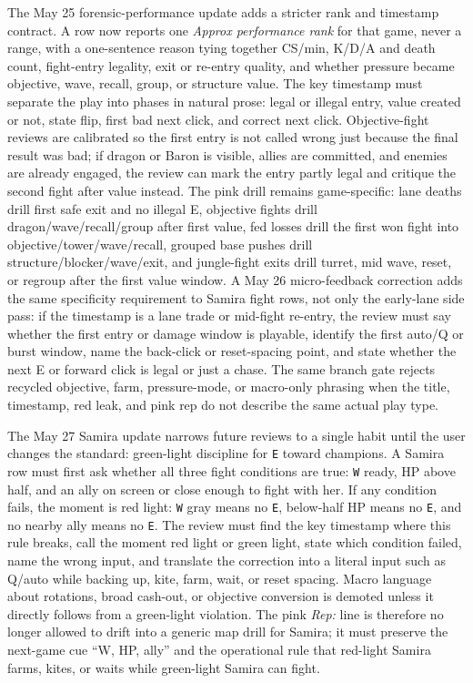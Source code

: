 \documentclass[12pt,letterpaper]{article}
\begin{document}
\noindent The May 25 forensic-performance update adds a stricter rank and timestamp contract. A row now reports one \emph{Approx performance rank} for that game, never a range, with a one-sentence reason tying together CS/min, K/D/A and death count, fight-entry legality, exit or re-entry quality, and whether pressure became objective, wave, recall, group, or structure value. The key timestamp must separate the play into phases in natural prose: legal or illegal entry, value created or not, state flip, first bad next click, and correct next click. Objective-fight reviews are calibrated so the first entry is not called wrong just because the final result was bad; if dragon or Baron is visible, allies are committed, and enemies are already engaged, the review can mark the entry partly legal and critique the second fight after value instead. The pink drill remains game-specific: lane deaths drill first safe exit and no illegal E, objective fights drill dragon/wave/recall/group after first value, fed losses drill the first won fight into objective/tower/wave/recall, grouped base pushes drill structure/blocker/wave/exit, and jungle-fight exits drill turret, mid wave, reset, or regroup after the first value window. A May 26 micro-feedback correction adds the same specificity requirement to Samira fight rows, not only the early-lane side pass: if the timestamp is a lane trade or mid-fight re-entry, the review must say whether the first entry or damage window is playable, identify the first auto/Q or burst window, name the back-click or reset-spacing point, and state whether the next E or forward click is legal or just a chase. The same branch gate rejects recycled objective, farm, pressure-mode, or macro-only phrasing when the title, timestamp, red leak, and pink rep do not describe the same actual play type.

\noindent The May 27 Samira update narrows future reviews to a single habit until the user changes the standard: green-light discipline for \texttt{E} toward champions. A Samira row must first ask whether all three fight conditions are true: \texttt{W} ready, HP above half, and an ally on screen or close enough to fight with her. If any condition fails, the moment is red light: \texttt{W} gray means no \texttt{E}, below-half HP means no \texttt{E}, and no nearby ally means no \texttt{E}. The review must find the key timestamp where this rule breaks, call the moment red light or green light, state which condition failed, name the wrong input, and translate the correction into a literal input such as Q/auto while backing up, kite, farm, wait, or reset spacing. Macro language about rotations, broad cash-out, or objective conversion is demoted unless it directly follows from a green-light violation. The pink \emph{Rep:} line is therefore no longer allowed to drift into a generic map drill for Samira; it must preserve the next-game cue ``W, HP, ally'' and the operational rule that red-light Samira farms, kites, or waits while green-light Samira can fight.
\end{document}
